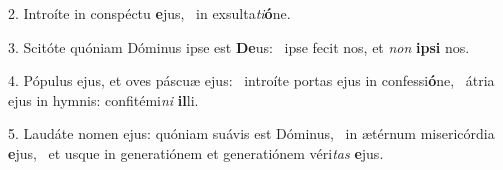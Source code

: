 2. Introíte in conspéctu \textbf{e}jus, \ast\  in exsulta\textit{ti}\textbf{ó}ne.\

3. Scitóte quóniam Dóminus ipse est \textbf{De}us: \ast\  ipse fecit nos, et \textit{non} \textbf{ip}\textbf{si} nos.\

4. Pópulus ejus, et oves páscuæ ejus: \dag\  introíte portas ejus in confessi\textbf{ó}ne, \ast\  átria ejus in hymnis: confitémi\textit{ni} \textbf{il}li.\

5. Laudáte nomen ejus: quóniam suávis est Dóminus, \dag\  in ætérnum misericórdia \textbf{e}jus, \ast\  et usque in generatiónem et generatiónem véri\textit{tas} \textbf{e}jus.\

